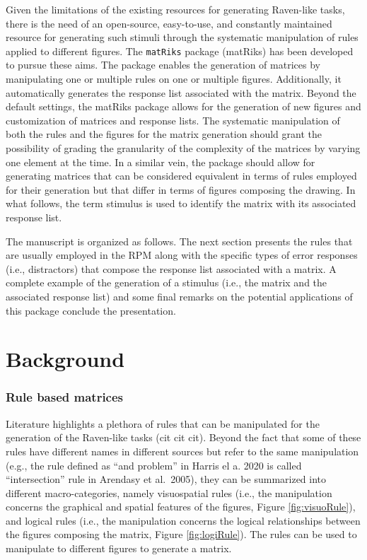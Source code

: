 Given the limitations of the existing resources for generating Raven-like tasks, there is the need of an open-source, easy-to-use, and constantly maintained resource for generating such stimuli through the systematic manipulation of rules applied to different figures.
The \texttt{matRiks} package (matRiks) has been developed to pursue these aims.
The package enables the generation of matrices by manipulating one or multiple rules on one or multiple figures.
Additionally, it automatically generates the response list associated with the matrix.
Beyond the default settings, the matRiks package allows for the generation of new figures and customization of matrices and response lists.
The systematic manipulation of both the rules and the figures for the matrix generation should grant the possibility of grading the granularity of the complexity of the matrices by varying one element at the time.
In a similar vein, the package should allow for generating matrices that can be considered equivalent in terms of rules employed for their generation but that differ in terms of figures composing the drawing.
In what follows, the term stimulus is used to identify the matrix with its associated response list.

The manuscript is organized as follows.
The next section presents the rules that are usually employed in the RPM along with the specific types of error responses (i.e., distractors) that compose the response list associated with a matrix.
A complete example of the generation of a stimulus (i.e., the matrix and the associated response list) and some final remarks on the potential applications of this package conclude the presentation.

\section{Background}\label{background}

\subsubsection{Rule based matrices}\label{rule-based-matrices}

Literature highlights a plethora of rules that can be manipulated for the generation of the Raven-like tasks (cit cit cit).
Beyond the fact that some of these rules have different names in different sources but refer to the same manipulation (e.g., the rule defined as ``and problem'' in Harris el a. 2020 is called ``intersection'' rule in Arendasy et al.~2005), they can be summarized into different macro-categories, namely visuospatial rules (i.e., the manipulation concerns the graphical and spatial features of the figures, Figure \ref{fig:visuoRule}), and logical rules (i.e., the manipulation concerns the logical relationships between the figures composing the matrix, Figure \ref{fig:logiRule}).
The rules can be used to manipulate to different figures to generate a matrix.


